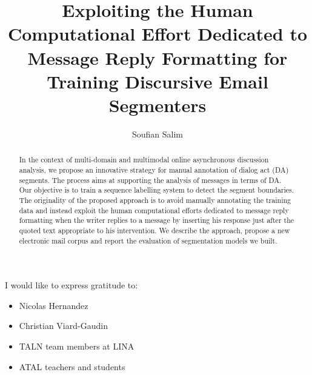 \documentclass[a4paper,12pt,twoside]{report}
\begin{document}
\title{\LARGE {\bf Exploiting the Human Computational Effort Dedicated to Message Reply Formatting for Training Discursive Email Segmenters}\\
 \vspace*{6mm}
}

\author{Soufian Salim}

\normallinespacing
\maketitle

\preface


\begin{abstract}

In the context of multi-domain and multimodal online asynchronous discussion analysis, we propose an innovative strategy for manual annotation of dialog act (DA) segments. The process aims at supporting the analysis of messages in terms of DA. Our objective is to train a sequence labelling system to detect the segment boundaries.  The originality of the proposed approach is to avoid manually annotating the training data and instead exploit the human computational efforts dedicated to message reply formatting  when the writer replies to a message by inserting his response just after the quoted text appropriate to his intervention. We describe the approach, propose a new electronic mail corpus and report the evaluation of segmentation models we built.

\end{abstract}

\cleardoublepage


\begin{acknowledgements}

I would like to express gratitude to:

\begin{itemize}
 \item Nicolas Hernandez
 \vspace*{3mm}
 \item Christian Viard-Gaudin
 \vspace*{3mm}
 \item TALN team members at LINA
 \vspace*{3mm}
 \item ATAL teachers and students
\end{itemize}

\end{acknowledgements}
\end{document}
